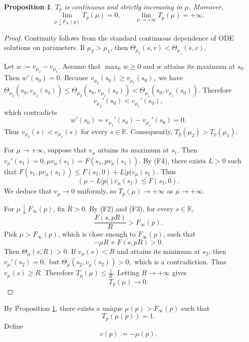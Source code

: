 \documentclass[preprint]{elsarticle}
\newtheorem{proposition}{Proposition}[section]
\numberwithin{equation}{section}
\begin{document}
\medskip
\begin{proposition}
 $T_p$ is continuous and strictly increasing in $\mu$. Moreover,
\begin{equation}
\lim_{\mu\downarrow F_\infty(p)}T_p(\mu)=0,
\qquad
\lim_{\mu\to+\infty}T_p(\mu)=+\infty.
\end{equation}
\label{monotonicity}
\end{proposition}
\begin{proof}
 Continuity follows from the standard continuous dependence of ODE solutions on parameters. If $\mu_2>\mu_1$, then
$
\Theta_{\mu_2}(s,v)<\Theta_{\mu_1}(s,v).
$

Let
$
w:=v_{\mu_2}-v_{\mu_1}.
$
Assume that $\max_{\mathbb R} w\ge0$ and $w$ attains its maximum at $s_0$. Then
$
w'(s_0)=0.
$
Because
$
v_{\mu_2}(s_0)\ge v_{\mu_1}(s_0),
$
we have
$
\Theta_{\mu_2}(s_0,v_{\mu_2}(s_0))
\le
\Theta_{\mu_2}(s_0,v_{\mu_1}(s_0))
<
\Theta_{\mu_1}(s_0,v_{\mu_1}(s_0)).
$
Therefore
$$
v_{\mu_2}'(s_0)<v_{\mu_1}'(s_0),
$$
which contradicts
$$
w'(s_0)=v_{\mu_2}'(s_0)-v_{\mu_1}'(s_0)=0.
$$
Thus
$
v_{\mu_2}(s)<v_{\mu_1}(s)
\text{ for every }s\in\mathbb R.
$
Consequently,
$
T_p(\mu_2)>T_p(\mu_1).
$

For $\mu\to+\infty$, suppose that $v_\mu$ attains its maximum at $s_1$. Then
$
v_\mu'(s_1)=0, 
\mu v_\mu(s_1)=F(s_1,pv_\mu(s_1)).
$
By (F4), there exists $L>0$ such that
$
F(s_1,pv_\mu(s_1))
\le F(s_1,0)+L|p|v_\mu(s_1).
$
Thus
\begin{equation*}
(\mu-L|p|)v_\mu(s_1)\le F(s_1,0).
\end{equation*}
We deduce that
$
v_\mu\to0
$
uniformly, so
$
T_p(\mu)\to+\infty
$
as $\mu\to+\infty$.

For $\mu\downarrow F_\infty(p)$, fix $R>0$. By (F2) and (F3), for every $s\in\mathbb R$,
\begin{equation*}
\frac{F(s,pR)}{R}>F_\infty(p).
\end{equation*}
Pick $\mu>F_\infty(p)$, which is close enough to $F_\infty(p)$, such that
\begin{equation*}
-\mu R+F(s,pR)>0.
\end{equation*}
Then
$
\Theta_\mu(s,R)>0.
$
If $v_\mu(s)<R$ and attains its minimum at $s_2$, then
$
v_\mu'(s_2)=0,
$
but
$
\Theta_\mu(s_2,v_\mu(s_2))>0,
$
which is a contradiction. Thus
$
v_\mu(s)\ge R.
$
Therefore
$
T_p(\mu)\le\frac1R.
$
Letting $R\to+\infty$ gives
$$
T_p(\mu)\to0.
$$
\end{proof}

By Proposition \ref{monotonicity}, there exists a unique $\mu(p)>F_\infty(p)$ such that
\begin{equation*}
T_p(\mu(p))=1.
\end{equation*}
Define 
\begin{equation}
c(p):=-\mu(p).
\end{equation}
\end{document}
